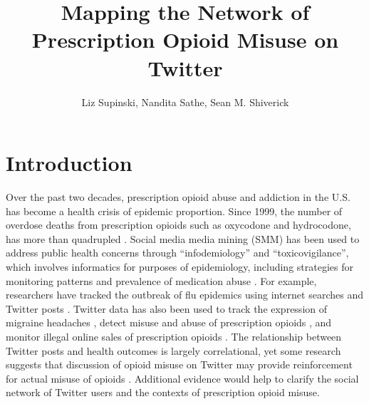 \documentclass[sigconf]{acmart}
\begin{document}
\title{Mapping the Network of Prescription Opioid Misuse on Twitter}


\author{Liz Supinski, Nandita Sathe, Sean M. Shiverick}

\renewcommand{\shortauthors}{Supinski, Sathe, Shiverick}




\maketitle


\section{Introduction}

Over the past two decades, prescription opioid abuse and addiction in the U.S. 
has become a health crisis of epidemic proportion. Since 1999, the number of 
overdose deaths from prescription opioids such as oxycodone and hydrocodone, 
has more than quadrupled \cite{nida18, cdc18}. Social media media mining (SMM) 
has been used to address public health concerns through “infodemiology” and 
“toxicovigilance”, which involves informatics for purposes of epidemiology, 
including strategies for monitoring patterns and prevalence of medication abuse 
\cite{eysenbach09, sarker16}. For example, researchers have tracked the outbreak 
of flu epidemics using internet searches and Twitter posts 
\cite{culotta10, paul14, lazer14}. Twitter data has also been used to track 
the expression of migraine headaches \cite{nascimento14}, detect misuse 
and abuse of prescription opioids \cite{sarker16, chary17, dzierak17}, and 
monitor illegal online sales of prescription opioids \cite{mackey17}. 
The relationship between Twitter posts and health outcomes is largely 
correlational, yet some research suggests that discussion of opioid misuse 
on Twitter may provide reinforcement for actual misuse of opioids 
\cite{hanson13}. Additional evidence would help to clarify the social network 
of Twitter users and the contexts of prescription opioid misuse. 
\end{document}
